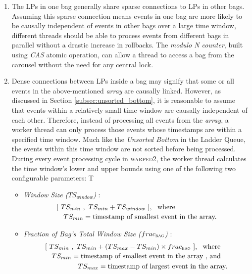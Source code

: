 \documentclass[11pt]{book}
\begin{document}
\begin{enumerate}

\item The LPs in one bag generally share sparse connections to LPs in other bags.  Assuming this sparse
  connection means events in one bag are more likely to be causally independent of events in other bags over a
  large time window, different threads should be able to process events from different bags in parallel
  without a drastic increase in rollbacks.  The \emph{modulo N counter}, built using \emph{CAS} atomic
  operation, can allow a thread to access a bag from the carousel without the need for any central lock.

\item Dense connections between LPs inside a bag may signify that some or all events in the above-mentioned
  \emph{array} are causally linked.  However, as discussed in Section \ref{subsec:unsorted_bottom}, it is
  reasonable to assume that events within a relatively small time window are causally independent of each
  other.  Therefore, instead of processing all events from the \emph{array}, a worker thread can only process
  those events whose timestamps are within a specified time window.  Much like the \emph{Unsorted Bottom} in
  the Ladder Queue, the events within this time window are not sorted before being processed.  During every
  event processing cycle in \textsc{warped2}, the worker thread calculates the time window's lower and upper
  bounds using one of the following two configurable parameters: T
  \begin{itemize}
  \item \emph{Window Size ($TS_{window}$)} :
    \begin{equation}
      \begin{multlined}
        \interval{\ TS_{min}\ }{\ TS_{min} + TS_{window}\ }, ~~ \text{where}\\
        TS_{min} = \text{timestamp of smallest event in the array.}
      \end{multlined}
      \label{eq:bag_window}
    \end{equation}
    
  \item \emph{Fraction of Bag's Total Window Size ($frac_{\textsc{bag}}$)} :
    \begin{equation}
      \begin{multlined}
        \interval{\ TS_{min}\ }{\ TS_{min} + (TS_{max} - TS_{min}) \times
          frac_{\textsc{bag}}\ }, ~~ \text{where}\\
        TS_{min} = \text{timestamp of smallest event in the array , and}\\
        TS_{max} = \text{timestamp of largest event in the array.}
      \end{multlined}
      \label{eq:bag_fraction}
    \end{equation}
  \end{itemize}
  

\end{enumerate}
\end{document}
